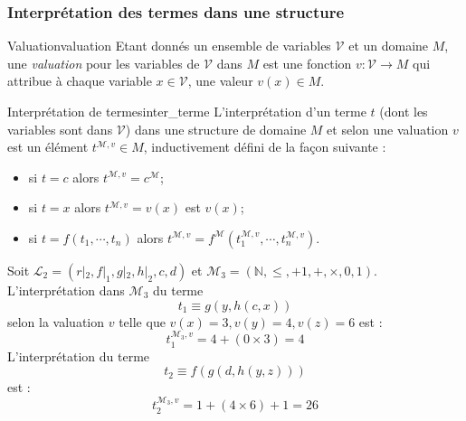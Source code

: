 \subsubsection{Interprétation des termes dans une structure}
\label{subsubsec:interprétation_termes_structure}

\begin{definition}{Valuation}{valuation}
    Etant donnés un ensemble de variables $\mathcal{V}$ et un domaine $M$, une \textit{valuation} pour les variables de $\mathcal{V}$
    dans $M$ est une fonction $v:\mathcal{V}\rightarrow M$ qui attribue à chaque variable $x\in \mathcal{V}$, une valeur $v(x)\in M$.
\end{definition}
\begin{definition}{Interprétation de termes}{inter_terme}
    L'interprétation d'un terme $t$ (dont les variables sont dans $\mathcal{V}$) dans une structure de domaine $M$ et selon une 
    valuation $v$ est un élément $t^{\mathcal{M},v}\in M$, inductivement défini de la façon suivante :
    \begin{itemize}[label=\textbullet]
        \item si $t=c$ alors $t^{\mathcal{M},v} = c^{\mathcal{M}}$;
        \item si $t=x$ alors $t^{\mathcal{M},v} = v(x)$ est $v(x)$;
        \item si $t=f(t_1,\cdots,t_n)$ alors $t^{\mathcal{M},v} = f^{\mathcal{M}}(t_1^{\mathcal{M},v},\cdots,t_n^{\mathcal{M},v})$.
    \end{itemize}
\end{definition}
\begin{example}
    Soit $\mathcal{L}_2 = (r|_2,f|_1,g|_2,h|_2,c,d)$ et $\mathcal{M}_3 = (\mathbb{N},\leq,+1,+,\times,0,1)$.\\
    L'interprétation dans $\mathcal{M}_3$ du terme 
    \begin{equation*}
        t_1 \equiv g(y,h(c,x))
    \end{equation*}
    selon la valuation $v$ telle que $v(x)=3, v(y)=4,v(z)=6$ est :
    \begin{equation*}
        t_1^{\mathcal{M}_3,v} = 4 + (0\times 3) = 4
    \end{equation*}
    L'interprétation du terme 
    \begin{equation*}
        t_2\equiv f(g(d,h(y,z)))
    \end{equation*}
    est :
    \begin{equation*}
        t_2^{\mathcal{M}_3,v} = 1 + (4\times 6) + 1 = 26
    \end{equation*}
\end{example}

